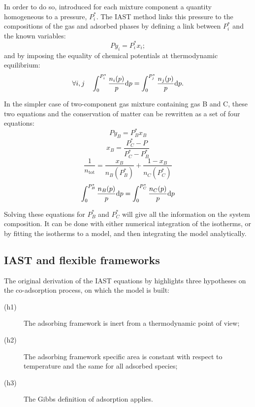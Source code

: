 \documentclass[thesis]{subfiles}
\begin{document}
In order to do so, \citeauthor{Myers1965}\cite{Myers1965} introduced for each
mixture component a quantity homogeneous to a pressure, $P_i^*$. The IAST method
links this pressure to the compositions of the gas and adsorbed phases by
defining a link between $P_i^*$ and the known variables:
\[P y_i = P_i^* x_i ;\label{eq:spreading}\]
and by imposing the equality of chemical potentials at thermodynamic equilibrium:
\[\label{eq:chem-pot} \forall i,j \quad \int_0^{P_i^*} \frac{n_i(p)}{p} \text{d} p = \int_0^{P_j^*} \frac{n_j(p)}{p} \text{d} p .\]

In the simpler case of two-component gas mixture containing gas B and C, these
two equations and the conservation of matter can be rewritten as a set of four
equations:
\[ P y_B = P_B^* x_B \]
\[ x_B = \frac{P_C^* - P}{P_C^* - P_B^*} \]
\[\frac1{n_\text{tot}} = \frac{x_B}{n_B(P_B^*)} + \frac{1 - x_B}{n_C(P_C^*)}\]
\[ \label{eq:iast}\int_0^{P_B^*} \frac{n_B(p)}{p} \text{d} p = \int_0^{P_C^*} \frac{n_C(p)}{p} \text{d} p\]

Solving these equations for $P_B^*$ and $P_C^*$ will give all the information on
the system composition. It can be done with either numerical integration of the
isotherms, or by fitting the isotherms to a model, and then integrating the
model analytically.


\subsection{IAST and flexible frameworks}

The original derivation of the IAST equations\cite{Myers1965} by
\citeauthor{Myers1965} highlights three hypotheses on the co-adsorption process,
on which the model is built:
\begin{description}
    \item[(h1)] The adsorbing framework is inert from a thermodynamic point of view;
    \item[(h2)] The adsorbing framework specific area is constant with respect to
                temperature and the same for all adsorbed species;
    \item[(h3)] The Gibbs definition of adsorption applies.
\end{description}
\end{document}
